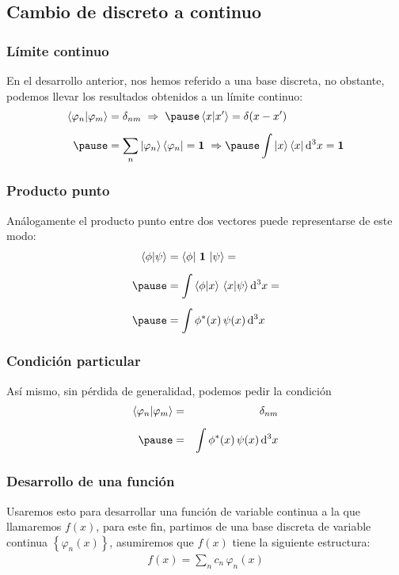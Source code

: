 \documentclass[12pt]{beamer}
\begin{document}
\subsection{Cambio de discreto a continuo}
\begin{frame}
\frametitle{Límite continuo}
En el desarrollo anterior, nos hemos referido a una base discreta, no obstante, podemos llevar los resultados obtenidos a un límite continuo:
\fontsize{12}{12}\selectfont
\begin{eqnarray}
\begin{aligned}[b]
\braket{\varphi_{n}}{\varphi_{m}} &= \delta_{nm} \hspace{0.1cm} \Rightarrow \hspace{0.1cm} \pause \braket{x}{\ptilde{x}} = \delta(x - \ptilde{x}) \\[0.5em] \pause
&= \sum_{n} \ket{\varphi_{n}} \bra{\varphi_{n}} = \mathbf{1} \hspace{0.1cm} \Rightarrow \hspace{0.cm} \pause \int \ket{x} \bra{x} \dd[3]{x} = \mathbf{1}
\end{aligned}
\label{eq:ecuacion_14}
\end{eqnarray}
\end{frame}
\begin{frame}
\frametitle{Producto punto}
Análogamente el producto punto entre dos vectores puede representarse de este modo:
\begin{eqnarray}
\begin{aligned}[b]
\braket{\phi}{\psi} &= \bra{\phi} \, \mathbf{1} \, \ket{\psi} = \\[0.5em] \pause
&= \int \braket{\phi}{x} \, \braket{x}{\psi} \dd[3]{x} = \\[0.5em] \pause
&= \int \phi^{*}(x) \, \psi (x) \dd[3]{x}
\end{aligned}
\label{eq:ecuacion_15}
\end{eqnarray}
\end{frame}
\begin{frame}
\frametitle{Condición particular}
Así mismo, sin pérdida de generalidad, podemos pedir la condición
\begin{eqnarray*}
\braket{\varphi_{n}}{\varphi_{m}} &=& \delta_{nm} \\[0.5em] \pause
&=& \int \phi^{*}(x) \, \psi (x) \dd[3]{x}
\end{eqnarray*}
\end{frame}
\begin{frame}
\frametitle{Desarrollo de una función}
Usaremos esto para desarrollar una función de variable continua a la que llamaremos $f(x)$, para este fin, partimos de una base discreta de variable continua $\left\{ \varphi_{n}(x) \right\}$, asumiremos que $f(x)$ tiene la siguiente estructura:
\begin{align}
f(x) = \sum_{n} c_{n} \, \varphi_{n}(x)
\label{eq:ecuacion_16}
\end{align}
\end{frame}
\end{document}
